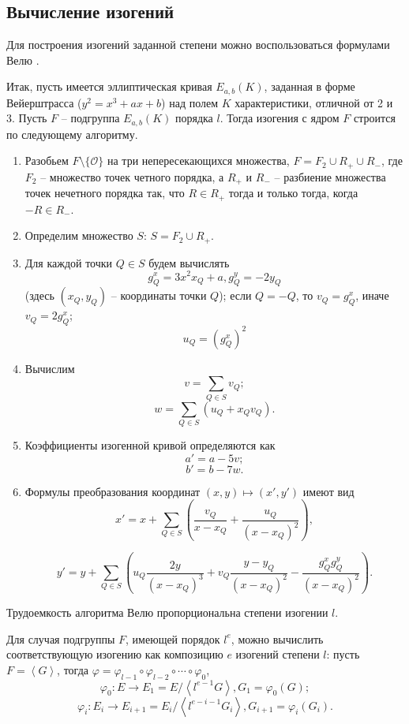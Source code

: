 \documentclass[a4paper,12pt]{article}
\newcommand{\tr}[1]{\left\langle #1\right\rangle}
\theoremstyle{definition}
\begin{document}
\subsection{Вычисление изогений}

Для построения изогений заданной степени можно воспользоваться формулами Велю \cite{Velu}. 

Итак, пусть имеется эллиптическая кривая $E_{a,b}(K)$, заданная в форме Вейерштрасса ($y^2=x^3+ax+b$) над полем $K$ характеристики, отличной от 2 и 3. Пусть $F$ -- подгруппа $E_{a,b}(K)$ порядка $l$. Тогда изогения с ядром $F$ строится по следующему алгоритму.

\begin{enumerate}
 \item Разобьем $F\setminus\{\mathcal{O}\}$ на три непересекающихся множества, $F=F_2\cup R_+\cup R_-$, где $F_2$ -- множество точек четного порядка,
 а $R_+$ и $R_-$ -- разбиение множества точек нечетного порядка так, что $R\in R_+$ тогда и только тогда, когда $-R\in R_-$.
 \item Определим множество $S$: $S=F_2\cup R_+$.
 \item Для каждой точки $Q\in S$ будем вычислять
 $$
 g_Q^x=3x^2x_Q+a, g_Q^y=-2y_Q
 $$
 (здесь $(x_Q,y_Q)$ -- координаты точки $Q$); 
 если $Q=-Q$, то $v_Q=g_Q^x$, иначе $v_Q=2g_Q^x$;
 $$
 u_Q=(g_Q^x)^2
  $$
  \item Вычислим
  $$
  v=\sum_{Q\in S} v_Q;
  $$
  $$
  w=\sum_{Q\in S} (u_Q+x_Qv_Q).
  $$
\item  Коэффициенты изогенной кривой определяются как 
$$
a'=a-5v;
$$
$$
b'=b-7w.
$$
\item Формулы преобразования координат $(x,y)\mapsto (x',y')$ имеют вид
$$
x'=x+\sum_{Q\in S} \left(\frac{v_Q}{x-x_Q}+\frac{u_Q}{(x-x_Q)^2}\right),
$$

$$
y'=y+\sum_{Q\in S} \left(u_Q\frac{2y}{(x-x_Q)^3}+v_Q\frac{y-y_Q}{(x-x_Q)^2}-\frac{g_Q^xg_Q^y}{(x-x_Q)^2}\right).
$$
  \end{enumerate}

  Трудоемкость алгоритма Велю пропорциональна степени изогении $l$.
  
Для случая подгруппы $F$, имеющей порядок $l^e$, можно вычислить соответствующую изогению как композицию $e$ изогений степени $l$:
пусть $F=\tr{G}$, тогда $\varphi=\varphi_{l-1}\circ\varphi_{l-2}\circ\cdots\circ \varphi_0$, 
$$\varphi_0:E\to E_1=E/\tr{l^{e-1}G}, G_1=\varphi_0(G);$$
$$\varphi_i:E_i\to E_{i+1}=E_i/\tr{l^{e-i-1}G_i}, G_{i+1}=\varphi_i(G_i). $$
  
\end{document}
